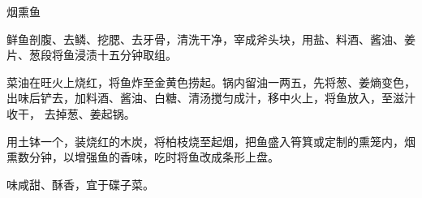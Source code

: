 \begin{recipe}{烟熏鱼}

\ingredients


\preparation

\step 鲜鱼剖腹、去鳞、挖腮、去牙骨，清洗干净，宰成斧头块，用盐、料酒、酱油、姜
片、葱段将鱼浸渍十五分钟取组。

\step 菜油在旺火上烧红，将鱼炸至金黄色捞起。锅内留油一两五，先将葱、姜熵变色，
出味后铲去，加料酒、酱油、白糖、清汤搅匀成汁，移中火上，将鱼放入，至滋汁收干，
去掉葱、姜起锅。

\step 用土钵一个，装烧红的木炭，将柏枝烧至起烟，把鱼盛入筲箕或定制的熏笼内，烟
熏数分钟，以增强鱼的香味，吃时将鱼改成条形上盘。

\features

味咸甜、酥香，宜于碟子菜。

\end{recipe}

